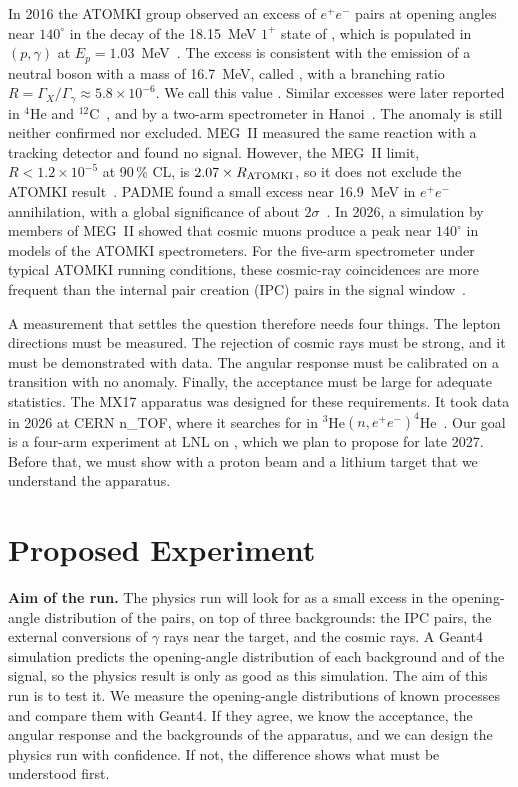 In 2016 the ATOMKI group observed an excess of $e^+e^-$ pairs at opening angles near $140^\circ$ in the decay of the
18.15~MeV $1^+$ state of \Be{}, which is populated in \Li$(p,\gamma)$ at $E_p = 1.03$~MeV~\cite{Kra16}. The excess
is consistent with the emission of a neutral boson with a mass of 16.7~MeV, called \Xs{}, with a branching ratio
$R = \Gamma_X/\Gamma_\gamma \approx 5.8\times10^{-6}$. We call this value \Ratk{}. Similar excesses were later reported in
$^4$He and $^{12}$C~\cite{Kra21,Kra22}, and by a two-arm spectrometer in Hanoi~\cite{Anh24}. The anomaly is still neither
confirmed nor excluded. MEG~II measured the same reaction with a tracking detector and found no signal. However, the
MEG~II limit, $R < 1.2\times10^{-5}$ at 90\,\% CL, is $2.07\times R_\mathrm{ATOMKI}$, so it does not exclude the ATOMKI
result~\cite{MEG24}. PADME found a small excess near 16.9~MeV in $e^+e^-$
annihilation, with a global significance of about $2\sigma$~\cite{PADME25}. In 2026, a simulation by members of MEG~II showed that cosmic muons produce a peak near
$140^\circ$ in models of the ATOMKI spectrometers. For the five-arm spectrometer under typical ATOMKI running conditions,
these cosmic-ray coincidences are more frequent than the internal pair creation (IPC) pairs in the signal window~\cite{MEG26}.

A measurement that settles the question therefore needs four things. The lepton directions must be measured. The
rejection of cosmic rays must be strong, and it must be demonstrated with data. The angular response must be
calibrated on a transition with no anomaly. Finally, the acceptance must be large for adequate statistics.
The MX17 apparatus was designed for these requirements. It took data in 2026 at CERN n\_TOF, where it searches for
\Xs{} in $^3$He$(n,e^+e^-)^4$He~\cite{Gus25,Mas26}. Our goal is a four-arm \Xs{} experiment at LNL on \Li\pee\Be{}, which we
plan to propose for late 2027. Before that, we must show with a proton beam and a lithium
target that we understand the apparatus. 

\section{Proposed Experiment}

\textbf{Aim of the run.} The physics run will look for \Xs{} as a small excess in the opening-angle distribution of
the pairs, on top of three backgrounds: the IPC pairs, the external conversions of $\gamma$ rays near the target, and
the cosmic rays. A Geant4 simulation predicts the opening-angle distribution of each background and of the signal, so
the physics result is only as good as this simulation. The aim of this run is to test it. We measure the opening-angle
distributions of known processes and compare them with Geant4. If they agree, we know the acceptance, the angular
response and the backgrounds of the apparatus, and we can design the physics run with confidence. If not, the difference
shows what must be understood first. 

